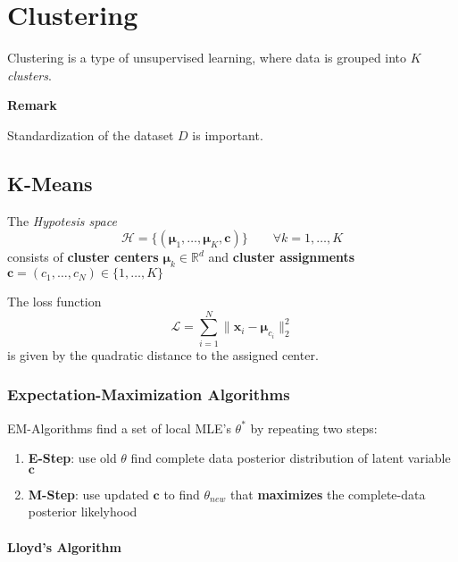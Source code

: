 \section{Clustering}
Clustering is a type of unsupervised learning, where data is grouped into $K$ \textit{clusters}.

\textbf{Remark}

Standardization of the dataset $D$ is important.

\subsection{K-Means}
The \textit{Hypotesis space}
\noindent\begin{equation*}
    \mathcal{H} = \{(\boldsymbol{\mu}_1,\ldots,\boldsymbol{\mu}_K,\mathbf{c})\}\qquad \forall k=1,\ldots, K
\end{equation*}
consists of \textbf{cluster centers} $\boldsymbol{\mu}_k\in \mathbb{R}^d$ and \textbf{cluster assignments} $\mathbf{c} = (c_1,\ldots,c_N)\in\{1,\ldots, K\}$

\newpar{}
The loss function
\noindent\begin{equation*}
    \mathcal{L}=\sum_{i=1}^{N} \|\mathbf{x}_i-\boldsymbol{\mu}_{c_i} \|_2^2
\end{equation*}
is given by the quadratic distance to the assigned center.

\subsubsection{Expectation-Maximization Algorithms}
EM-Algorithms find a set of local MLE's $\theta^*$ by repeating two steps:
\begin{enumerate}
    \item \textbf{E-Step}: use old $\theta$ find complete data posterior distribution of latent variable $\mathbf{c}$
    \item \textbf{M-Step}: use updated $\mathbf{c}$ to find $\theta_{new}$ that \textbf{maximizes} the complete-data posterior likelyhood
\end{enumerate}

\paragraph{Lloyd's Algorithm}

